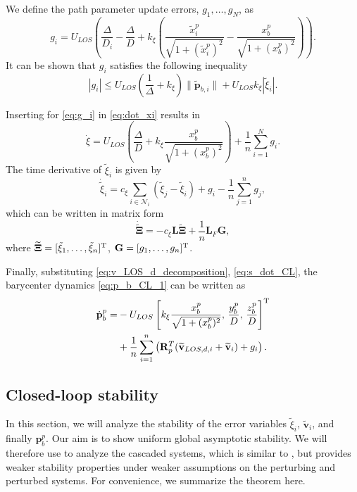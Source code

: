 We define the path parameter update errors,  $g_1, \ldots , g_N$, as
\begin{equation}\label{eq:g_i}
  g_i = U_{LOS\!} \left(\!\frac{\Delta}{D_i} - \frac{\Delta}{D} + k_\xi \! \left(\frac{\tilde{x}_{i}^p}{\sqrt{1 + (\tilde{x}_{i}^p)^2}} - \frac{x_{b}^p}{\sqrt{1 + (x_{b}^p)^2}}\right)\!\right).
\end{equation}
It can be shown that $g_i$ satisfies the following inequality
\begin{equation}
    |g_i| \leq U_{LOS}\left(\frac{1}{\Delta} + k_\xi\right)\|\widetilde{\mathbf{p}}_{b,i} \| + U_{LOS} k_\xi |\tilde{\xi}_i|.
        \label{eq:g_i_bound}
\end{equation}

Inserting for \eqref{eq:g_i} in \eqref{eq:dot_xi} results in
\begin{equation}
    \dot{\xi} = U_{LOS} \left(\!\frac{\Delta}{D} + k_\xi \frac{x_{b}^p}{\sqrt{1 + (x_{b}^p)^2}}\right) + \frac{1}{n} \sum_{i=1}^N g_i.
        \label{eq:s_dot_CL}
\end{equation}
The time derivative of $\tilde{\xi}_i$ is given by
\begin{equation}
    \dot{\tilde{\xi}}_i = c_\xi \sum_{i\in\mathcal{N}_i}(\tilde{\xi}_j-\tilde{\xi}_i) + g_i - \frac{1}{n}\sum_{j=1}^n g_j,
\end{equation}
which can be written in matrix form
\begin{equation}
    \dot{\widetilde{\bm{\Xi}}} = -c_\xi \mathbf{L} \widetilde{\bm{\Xi}} + \frac{1}{n} \mathbf{L}_{F} \mathbf{G},
\label{eq:S_tilde_CL}
\end{equation}
where $\widetilde{\bm{\Xi}} = [\tilde{\xi}_1, \ldots, \tilde{\xi}_n]^{\rm T}$, $\mathbf{G} = [g_1, \ldots, g_n]^{\rm T}$.

Finally, substituting \eqref{eq:v_LOS_d_decomposition}, \eqref{eq:s_dot_CL}, the barycenter dynamics \eqref{eq:p_b_CL_1} can be written as
\begin{equation}\label{eq:path_following_subsystem}
    \begin{split}
    \dot{\mathbf{p}}_b^p = &- U_{LOS} \left[k_\xi\frac{x_{b}^p}{\sqrt{1 + (x_{b}^p)^2}},\, \frac{y_b^p}{D},\, \frac{z_b^p}{D} \right]^{\rm T}\\
    &+ \frac{1}{n}\sum_{i=1}^n \left(\mathbf{R}_p^T(\widetilde{\mathbf{v}}_{LOS,d,i} + \widetilde{\mathbf{v}}_i) + g_i\right).
    \end{split}
\end{equation}

\subsection{Closed-loop stability}
In this section, we will analyze the stability of the error variables $\tilde{\xi}_i$, $\widetilde{\mathbf{v}}_i$, and finally $\mathbf{p}_b^p$. Our aim is to show uniform global asymptotic stability. We will therefore use \cite[Theorem 2.1]{lamnabhi-lagarrigue_2_2005} to analyze the cascaded systems, which is similar to \cite[Proposition 9]{pettersen_lyapunov_2017}, but provides weaker stability properties under weaker assumptions on the perturbing and perturbed systems. For convenience, we summarize the theorem here.

